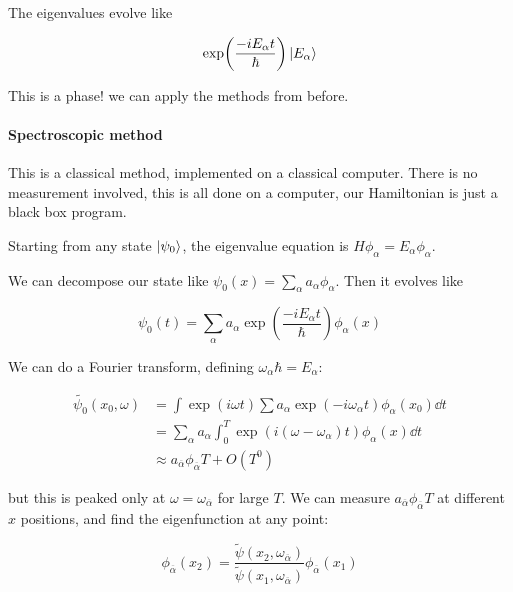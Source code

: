 \documentclass[main.tex]{subfiles}
\begin{document}
The eigenvalues evolve like

\begin{equation}
  \exp(\frac{-iE_\alpha t}{\hbar}) \ket{E_\alpha}
\end{equation}

This is a phase! we can apply the methods from before.

\paragraph{Spectroscopic method}

This is a classical  method, implemented on a classical computer. There is no measurement involved, this is all done on a computer, our Hamiltonian is just a black box program.

Starting from any state \(\ket{\psi_0} \), the eigenvalue equation is \(H \phi_\alpha = E_\alpha \phi_\alpha\).

We can decompose our state like \(\psi_0(x )= \sum _{\alpha} a_\alpha \phi_\alpha \). Then it evolves like

\begin{equation}
  \psi_0 (t) = \sum _{\alpha}  a_\alpha \exp(\frac{-i E_\alpha t}{\hbar}) \phi_\alpha (x)
\end{equation}

We can do a Fourier transform, defining \(\omega_\alpha \hbar = E_\alpha\):

\begin{subequations}
\begin{align}
  \widetilde{\psi_0}(x_0, \omega) &= \int \exp(i \omega t) \sum  a_\alpha \exp(-i \omega_\alpha t) \phi_\alpha (x_0)  \dd{t}  \\
  &= \sum _{\alpha} a_\alpha \int _{0} ^{T} \exp(i (\omega - \omega_\alpha) t) \phi_\alpha (x) \dd{t}  \\
  &\approx a _{\overline{\alpha} } \phi _{\overline{\alpha} } T + O(T^0)
\end{align}
\end{subequations}

but this is peaked only at \(\omega = \omega _{\overline{\alpha} } \) for large \(T\). We can measure \(a _{\overline{\alpha} } \phi _{\overline{\alpha} } T\) at different \(x\) positions, and find the eigenfunction at any point:

\begin{equation}
  \phi _{\overline{\alpha} }(x_2) = \frac{\widetilde{\psi}(x_2, \omega _{\overline{\alpha} } )}{\widetilde{\psi}(x_1, \omega _{\overline{\alpha} } )} \phi _{\overline{\alpha} }(x_1)
\end{equation}
\end{document}
